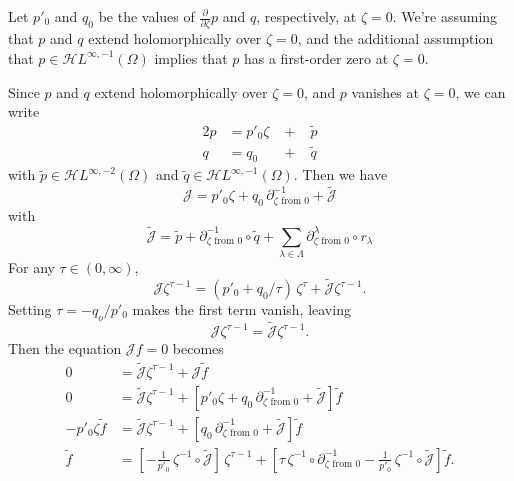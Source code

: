 \documentclass{article}
\theoremstyle{plain}
\newcommand{\holoL}[1]{\mathcal{H}L^{#1}} %
\begin{document}
Let $p'_0$ and $q_0$ be the values of $\tfrac{\partial}{\partial \zeta} p$ and $q$, respectively, at $\zeta = 0$. We're assuming that $p$ and $q$ extend holomorphically over $\zeta = 0$, and the additional assumption that $p \in \holoL{\infty, -1}(\Omega)$ implies that $p$ has a first-order zero at $\zeta = 0$.

Since $p$ and $q$ extend holomorphically over $\zeta = 0$, and $p$ vanishes at $\zeta = 0$, we can write
\begin{alignat*}{2}
p & = p'_0 \zeta &\;+\;& \tilde{p} \\
q & = q_0 &\;+\;& \tilde{q}
\end{alignat*}
with $\tilde{p} \in \holoL{\infty, -2}(\Omega)$ and $\tilde{q} \in \holoL{\infty, -1}(\Omega)$. Then we have
\[ \mathcal{J} = p'_0\zeta + q_0\,\partial^{-1}_{\zeta \text{ from } 0} + \tilde{\mathcal{J}} \]
with
\[ \tilde{\mathcal{J}} = \tilde{p} + \partial^{-1}_{\zeta \text{ from } 0} \circ \tilde{q} + \sum_{\lambda \in \Lambda} \partial^\lambda_{\zeta \text{ from } 0} \circ r_\lambda \]
For any $\tau \in (0, \infty)$,
\[ \mathcal{J} \zeta^{\tau-1} = (p'_0 + q_0/\tau)\,\zeta^\tau + \tilde{\mathcal{J}} \zeta^{\tau-1}. \]
Setting $\tau = -q_o / p'_0$ makes the first term vanish, leaving
\[ \mathcal{J} \zeta^{\tau-1} = \tilde{\mathcal{J}} \zeta^{\tau-1}. \]
Then the equation $\mathcal{J}f = 0$ becomes
\begin{align}
0 & = \tilde{\mathcal{J}}\zeta^{\tau-1} + \mathcal{J}\tilde{f} \nonumber \\
0 & = \tilde{\mathcal{J}}\zeta^{\tau-1} + \left[ p'_0\zeta + q_0\,\partial^{-1}_{\zeta \text{ from } 0} + \tilde{\mathcal{J}} \right]\tilde{f} \nonumber \\
-p'_0\zeta\tilde{f} & = \tilde{\mathcal{J}}\zeta^{\tau-1} + \left[ q_0\,\partial^{-1}_{\zeta \text{ from } 0} + \tilde{\mathcal{J}} \right]\tilde{f} \nonumber \\
\tilde{f} & = \left[ -\tfrac{1}{p'_0}\,\zeta^{-1} \circ \tilde{\mathcal{J}} \right]\,\zeta^{\tau-1} + \left[ \tau\,\zeta^{-1} \circ \partial^{-1}_{\zeta \text{ from } 0} - \tfrac{1}{p'_0}\,\zeta^{-1} \circ \tilde{\mathcal{J}} \right]\tilde{f}. \label{fixed-pt}
\end{align}
\end{document}
